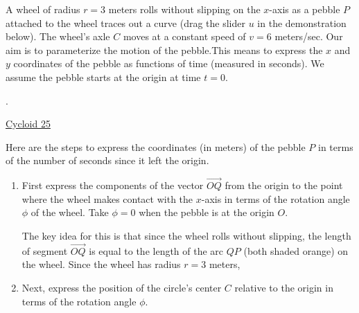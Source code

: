\documentclass{ximera}
\begin{document}
\begin{question}  \label{Exhjjjjnbbbbbr}

A wheel of radius $r=3$ meters rolls without slipping on the $x$-axis as a pebble $P$ attached to the wheel traces out a curve (drag the slider $u$ in the demonstration below). The wheel's axle $C$ moves  at a constant speed of $v=6$ meters/sec. Our aim is to parameterize the motion of the pebble.This means to express the $x$ and $y$ coordinates of the pebble as functions of time (measured in seconds). We assume the pebble starts at the origin at time $t=0$. 



 
\begin{onlineOnly}
    \begin{center}
\end{center}
\end{onlineOnly}


.

\begin{onlineOnly}
    \begin{center}
\end{center}
\end{onlineOnly}

\href{https://www.desmos.com/calculator/57fg1na7yl}{Cycloid 25}

Here are the steps to express the coordinates (in meters) of the pebble $P$ in terms of the number of seconds since it left the origin.

\begin{enumerate}
\item First express the components of the vector $\overrightarrow{OQ}$ from the origin to the point where the wheel makes contact with the $x$-axis in terms of the rotation angle $\phi$ of the wheel. Take $\phi=0$ when the pebble is at the origin $O$.

The key idea for this is that since the wheel rolls without slipping, the length of segment $\overrightarrow{OQ}$ is equal to the length of the arc $QP$ (both shaded orange) on the wheel. Since the wheel has radius $r=3$ meters,

\item Next, express the position of the circle's center $C$ relative to the origin in terms of the rotation angle $\phi$.


\end{enumerate}
\end{question}
\end{document}
